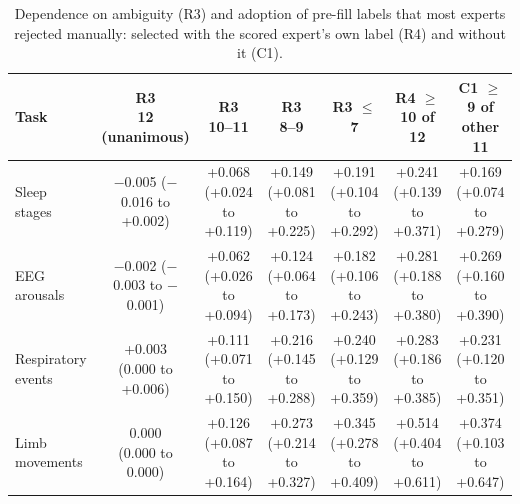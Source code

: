 \begin{table}[h!]
\centering
\footnotesize
\caption{Dependence on ambiguity (R3) and adoption of pre-fill labels that most experts rejected manually: selected with the scored expert's own label (R4) and without it (C1).}
\label{tab:s-r3r4}
\begin{adjustbox}{max width=\linewidth}
\begin{tabular}{lcccccc}
\toprule
Task & \makecell{R3\\12 (unanimous)} & \makecell{R3\\10--11} & \makecell{R3\\8--9} & \makecell{R3\\$\le$7} & \makecell{R4\\$\ge$10 of 12} & \makecell{C1\\$\ge$9 of other 11} \\
\midrule
Sleep stages & \makecell{\ensuremath{-}0.005\\(\ensuremath{-}0.016 to +0.002)} & \makecell{+0.068\\(+0.024 to +0.119)} & \makecell{+0.149\\(+0.081 to +0.225)} & \makecell{+0.191\\(+0.104 to +0.292)} & \makecell{+0.241\\(+0.139 to +0.371)} & \makecell{+0.169\\(+0.074 to +0.279)} \\
EEG arousals & \makecell{\ensuremath{-}0.002\\(\ensuremath{-}0.003 to \ensuremath{-}0.001)} & \makecell{+0.062\\(+0.026 to +0.094)} & \makecell{+0.124\\(+0.064 to +0.173)} & \makecell{+0.182\\(+0.106 to +0.243)} & \makecell{+0.281\\(+0.188 to +0.380)} & \makecell{+0.269\\(+0.160 to +0.390)} \\
Respiratory events & \makecell{+0.003\\(0.000 to +0.006)} & \makecell{+0.111\\(+0.071 to +0.150)} & \makecell{+0.216\\(+0.145 to +0.288)} & \makecell{+0.240\\(+0.129 to +0.359)} & \makecell{+0.283\\(+0.186 to +0.385)} & \makecell{+0.231\\(+0.120 to +0.351)} \\
Limb movements & \makecell{0.000\\(0.000 to 0.000)} & \makecell{+0.126\\(+0.087 to +0.164)} & \makecell{+0.273\\(+0.214 to +0.327)} & \makecell{+0.345\\(+0.278 to +0.409)} & \makecell{+0.514\\(+0.404 to +0.611)} & \makecell{+0.374\\(+0.103 to +0.647)} \\

\end{tabular}
\end{adjustbox}
\end{table}
